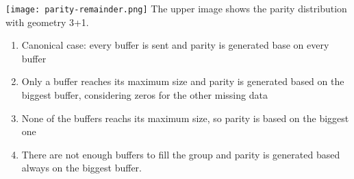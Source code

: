 \newpage
\texttt{[image: parity-remainder.png]}
The upper image shows the parity distribution with geometry 3+1.
\begin{enumerate}
    \item Canonical case: every buffer is sent and parity is generated base on every buffer
    \item Only a buffer reaches its maximum size and parity is generated based on the biggest buffer,
        considering zeros for the other missing data
    \item None of the buffers reachs its maximum size, so parity is based on the biggest one
    \item There are not enough buffers to fill the group and parity is generated based always
        on the biggest buffer.
\end{enumerate}

